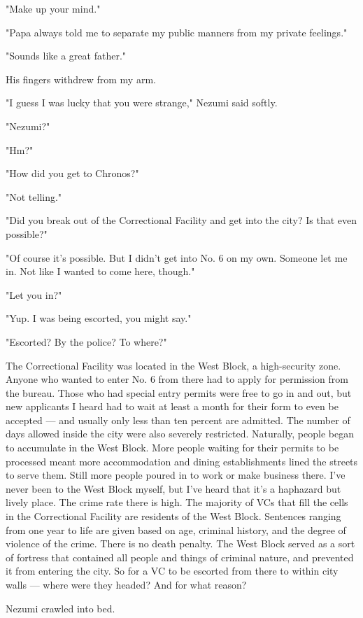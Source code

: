 "Make up your mind."

"Papa always told me to separate my public manners from my private
feelings."

"Sounds like a great father."

His fingers withdrew from my arm.

"I guess I was lucky that you were strange," Nezumi said softly.

"Nezumi?"

"Hm?"

"How did you get to Chronos?"

"Not telling."

"Did you break out of the Correctional Facility and get into the city?
Is that even possible?"

"Of course it's possible. But I didn't get into No. 6 on my own. Someone
let me in. Not like I wanted to come here, though."

"Let you in?"

"Yup. I was being escorted, you might say."

"Escorted? By the police? To where?"

The Correctional Facility was located in the West Block, a high-security
zone. Anyone who wanted to enter No. 6 from there had to apply for
permission from the bureau. Those who had special entry permits were
free to go in and out, but new applicants I heard had to wait at least a
month for their form to even be accepted --- and usually only less than
ten percent are admitted. The number of days allowed inside the city
were also severely restricted. Naturally, people began to accumulate in
the West Block. More people waiting for their permits to be processed
meant more accommodation and dining establishments lined the streets to
serve them. Still more people poured in to work or make business there.
I've never been to the West Block myself, but I've heard that it's a
haphazard but lively place. The crime rate there is high. The majority
of VCs that fill the cells in the Correctional Facility are residents of
the West Block. Sentences ranging from one year to life are given based
on age, criminal history, and the degree of violence of the crime. There
is no death penalty. The West Block served as a sort of fortress that
contained all people and things of criminal nature, and prevented it
from entering the city. So for a VC to be escorted from there to within
city walls --- where were they headed? And for what reason?

Nezumi crawled into bed.

